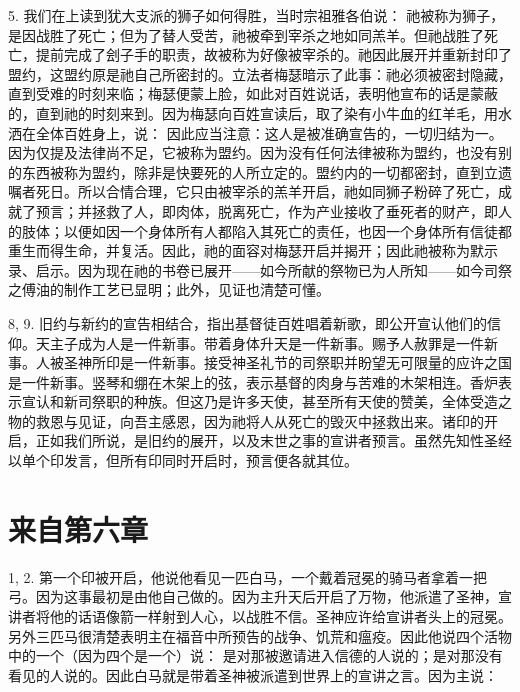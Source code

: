 5.  我们在上读到犹大支派的狮子如何得胜，当时宗祖雅各伯说：  祂被称为狮子，是因战胜了死亡；但为了替人受苦，祂被牵到宰杀之地如同羔羊。但祂战胜了死亡，提前完成了刽子手的职责，故被称为好像被宰杀的。祂因此展开并重新封印了盟约，这盟约原是祂自己所密封的。立法者梅瑟暗示了此事：祂必须被密封隐藏，直到受难的时刻来临；梅瑟便蒙上脸，如此对百姓说话，表明他宣布的话是蒙蔽的，直到祂的时刻来到。因为梅瑟向百姓宣读后，取了染有小牛血的红羊毛，用水洒在全体百姓身上，说：  因此应当注意：这人是被准确宣告的，一切归结为一。因为仅提及法律尚不足，它被称为盟约。因为没有任何法律被称为盟约，也没有别的东西被称为盟约，除非是快要死的人所立定的。盟约内的一切都密封，直到立遗嘱者死日。所以合情合理，它只由被宰杀的羔羊开启，祂如同狮子粉碎了死亡，成就了预言；并拯救了人，即肉体，脱离死亡，作为产业接收了垂死者的财产，即人的肢体；以便如因一个身体所有人都陷入其死亡的责任，也因一个身体所有信徒都重生而得生命，并复活。因此，祂的面容对梅瑟开启并揭开；因此祂被称为默示录、启示。因为现在祂的书卷已展开——如今所献的祭物已为人所知——如今司祭之傅油的制作工艺已显明；此外，见证也清楚可懂。\par

8, 9.  旧约与新约的宣告相结合，指出基督徒百姓唱着新歌，即公开宣认他们的信仰。天主子成为人是一件新事。带着身体升天是一件新事。赐予人赦罪是一件新事。人被圣神所印是一件新事。接受神圣礼节的司祭职并盼望无可限量的应许之国是一件新事。竖琴和绷在木架上的弦，表示基督的肉身与苦难的木架相连。香炉表示宣认和新司祭职的种族。但这乃是许多天使，甚至所有天使的赞美，全体受造之物的救恩与见证，向吾主感恩，因为祂将人从死亡的毁灭中拯救出来。诸印的开启，正如我们所说，是旧约的展开，以及末世之事的宣讲者预言。虽然先知性圣经以单个印发言，但所有印同时开启时，预言便各就其位。\par


\section{来自第六章}

1, 2.  第一个印被开启，他说他看见一匹白马，一个戴着冠冕的骑马者拿着一把弓。因为这事最初是由他自己做的。因为主升天后开启了万物，他派遣了圣神，宣讲者将他的话语像箭一样射到人心，以战胜不信。圣神应许给宣讲者头上的冠冕。另外三匹马很清楚表明主在福音中所预告的战争、饥荒和瘟疫。因此他说四个活物中的一个（因为四个是一个）说： 是对那被邀请进入信德的人说的；是对那没有看见的人说的。因此白马就是带着圣神被派遣到世界上的宣讲之言。因为主说：\par

